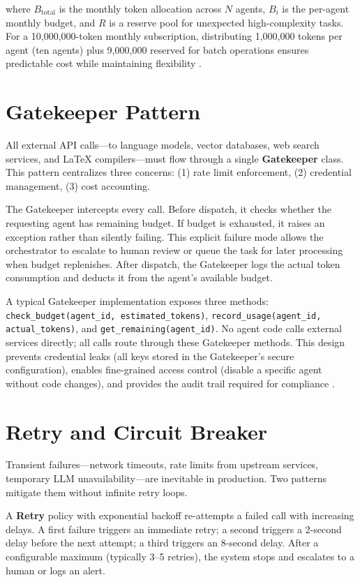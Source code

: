 where $B_{\text{total}}$ is the monthly token allocation across $N$ agents, $B_{i}$ is the per-agent monthly budget, and $R$ is a reserve pool for unexpected high-complexity tasks. For a 10{,}000{,}000-token monthly subscription, distributing 1{,}000{,}000 tokens per agent (ten agents) plus 9{,}000{,}000 reserved for batch operations ensures predictable cost while maintaining flexibility \cite{CrewAI2024}.

\section{Gatekeeper Pattern}

All external API calls—to language models, vector databases, web search services, and LaTeX compilers—must flow through a single \textbf{Gatekeeper} class. This pattern centralizes three concerns: (1) rate limit enforcement, (2) credential management, (3) cost accounting.

The Gatekeeper intercepts every call. Before dispatch, it checks whether the requesting agent has remaining budget. If budget is exhausted, it raises an exception rather than silently failing. This explicit failure mode allows the orchestrator to escalate to human review or queue the task for later processing when budget replenishes. After dispatch, the Gatekeeper logs the actual token consumption and deducts it from the agent's available budget.

A typical Gatekeeper implementation exposes three methods: \texttt{check\_budget(agent\_id, estimated\_tokens)}, \texttt{record\_usage(agent\_id, actual\_tokens)}, and \texttt{get\_remaining(agent\_id)}. No agent code calls external services directly; all calls route through these Gatekeeper methods. This design prevents credential leaks (all keys stored in the Gatekeeper's secure configuration), enables fine-grained access control (disable a specific agent without code changes), and provides the audit trail required for compliance \cite{Segal2026}.

\section{Retry and Circuit Breaker}

Transient failures—network timeouts, rate limits from upstream services, temporary LLM unavailability—are inevitable in production. Two patterns mitigate them without infinite retry loops.

A \textbf{Retry} policy with exponential backoff re-attempts a failed call with increasing delays. A first failure triggers an immediate retry; a second triggers a 2-second delay before the next attempt; a third triggers an 8-second delay. After a configurable maximum (typically 3–5 retries), the system stops and escalates to a human or logs an alert.


